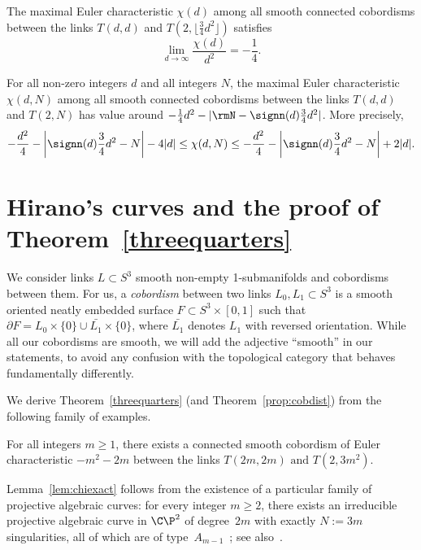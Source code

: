 \setcounter{section}{1}\setcounter{theo}{0}
\begin{theo}\label{threequarters}
The maximal Euler characteristic $\chi(d)$ among all smooth connected cobordisms between the links $T(d,d)$ and $T(2,\lfloor\frac{3}{4}d^2\rfloor)$ satisfies
\[
\lim_{d \to \infty} \frac{\chi(d)}{d^2}=-\frac{1}{4}.
\]
\end{theo}


\begin{theo}\label{prop:cobdist}
For all non-zero integers $d$ and all integers $N$, the maximal Euler characteristic $\chi(d,N)$ among all smooth connected cobordisms between the links $T(d,d)$ and $T(2,N)$ has value around $-\frac{1}{4}d^2-|\rmN-\signn(d)\frac{3}{4}d^2|$. More precisely,
\[
-\frac{d^2}{4}-\left|\signn(d)\frac{3}{4}d^2-N\right|-4|d|
\leq\chi(d,N)\leq -\frac{d^2}{4}-\left|\signn(d)\frac{3}{4}d^2-N\right|+2|d|.
\]
\end{theo}


\section{Hirano's curves and the proof of Theorem~\ref{threequarters} }\label{sec:main}

We consider links $L\subset S^3$ smooth non-empty 1-submanifolds and cobordisms between them. For us, a \emph{cobordism} between two links $L_0,L_1\subset S^3$ is a smooth oriented neatly embedded surface $F\subset S^3\times[0,1]$ such that $\partial F=L_0\times\{0\}\cup \bar{L_1}\times\{0\}$, where $\bar{L_1}$ denotes $L_1$ with reversed orientation. While all our cobordisms are smooth, we will add the adjective ``smooth'' in our statements, to avoid any confusion with the topological category that behaves fundamentally differently.

We derive Theorem~\ref{threequarters} (and Theorem~\ref{prop:cobdist}) from the following family of examples.

\begin{lemm}\label{lem:chiexact}
For all integers $m\geq 1$, there exists a connected smooth cobordism of Euler characteristic $-m^2-2m$ between the links $T(2m,2m)\text{ and } T(2,3m^2)$.
\end{lemm}

Lemma~\ref{lem:chiexact} follows from the existence of a particular family of projective algebraic curves: for every integer $m\geq 2$, there exists an irreducible projective algebraic curve in $\C\P^2$ of degree~$2m$ with exactly $N:= 3m$ singularities, all of which are of type~$A_{m-1}$~\cite[Theorem~2]{Hirano_92}; see also~\cite[Theorem~3.2]{GS08}.

